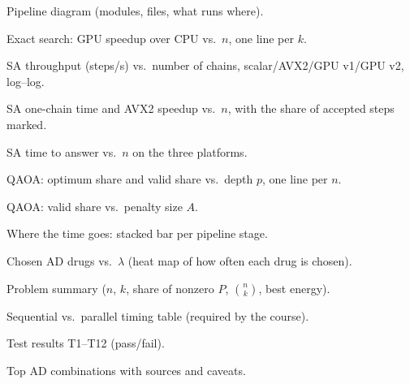 \begin{description}[leftmargin=1.1cm,style=sameline]
\item[F1] Pipeline diagram (modules, files, what runs where).
\item[F2] Exact search: GPU speedup over CPU vs.\ $n$, one line per $k$.
\item[F3] SA throughput (steps/s) vs.\ number of chains, scalar/AVX2/GPU v1/GPU v2, log--log.
\item[F4] SA one-chain time and AVX2 speedup vs.\ $n$, with the share of accepted steps marked.
\item[F5] SA time to answer vs.\ $n$ on the three platforms.
\item[F6] QAOA: optimum share and valid share vs.\ depth $p$, one line per $n$.
\item[F7] QAOA: valid share vs.\ penalty size $A$.
\item[F8] Where the time goes: stacked bar per pipeline stage.
\item[F9] Chosen AD drugs vs.\ $\lambda$ (heat map of how often each drug is chosen).
\item[T1] Problem summary ($n$, $k$, share of nonzero $P$, $\binom{n}{k}$, best energy).
\item[T2] Sequential vs.\ parallel timing table (required by the course).
\item[T3] Test results T1--T12 (pass/fail).
\item[T4] Top AD combinations with sources and caveats.
\end{description}
